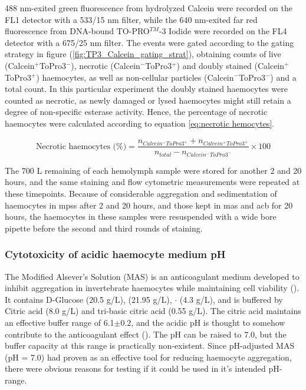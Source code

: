 488 nm-exited green fluorescence from hydrolyzed Calcein were recorded on the FL1 detector with a 533/15 nm filter, while the 640 nm-exited far red fluorescence from DNA-bound TO-PRO$^{TM}$-3 Iodide were recorded on the FL4 detector with a 675/25 nm filter. The events were gated according to the gating strategy in figure (\ref{fig:TP3_Calcein_gating_strat}), obtaining counts of live (Calcein$^{+}$ToPro3$^{-}$), necrotic (Calcein$^{-}$ToPro3$^{+}$) and doubly stained (Calcein$^{+}$ToPro3$^{+}$) haemocytes, as well as non-cellular particles (Calcein$^{-}$ToPro3$^{-}$) and a total count. In this particular experiment the doubly stained haemocytes were counted as necrotic, as newly damaged or lysed haemocytes might still retain a degree of non-specific esterase activity. Hence, the percentage of necrotic haemocytes were calculated according to equation \ref{eq:necrotic hemocytes}.

\begin{equation}
    \label{eq:necrotic hemocytes}
    \text{Necrotic haemocytes (\%)} = \dfrac{n_{Calcein^{-}ToPro3^{+}} + n_{Calcein^{+}ToPro3^{+}}}{n_{total} - n_{Calcein^{-}ToPro3^{-}}} \times 100
\end{equation}

The 700 \micro L remaining of each hemolymph sample were stored for another 2 and 20 hours, and the same staining and flow cytometric measurements were repeated at these timepoints. Because of considerable aggregation and sedimentation of haemocytes in \acrshort{mpss} after 2 and 20 hours, and those kept in \acrshort{mas} and \acrshort{acb} for 20 hours, the haemocytes in these samples were resuspended with a wide bore pipette before the second and third rounds of staining.

\subsubsection{Cytotoxicity of acidic haemocyte medium pH}
The Modified Alsever's Solution (MAS) is an anticoagulant medium developed to inhibit aggregation in invertebrate haemocytes while maintaining cell viability (\cite{Bachere1988}). It contains D-Glucose (20.5 g/L),  (21.95 g/L), $\cdot$ (4.3 g/L), and is buffered by Citric acid (8.0 g/L) and tri-basic citric acid (0.55 g/L). The citric acid maintains an effective buffer range of 6.1$\pm{0.2}$, and the acidic pH is thought to somehow contribute to the anticoagulant effect (\cite{Söderhall1983, Renwartz1990}). The pH can be raised to 7.0, but the buffer capacity at this range is practically non-existent. Since pH-adjusted MAS (pH = 7.0) had proven as an effective tool for reducing haemocyte aggregation, there were obvious reasons for testing if it could be used in it's intended pH-range.

